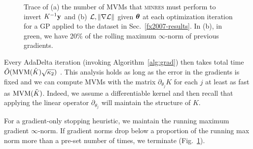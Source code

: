 \documentclass{article}
\begin{document}
\begin{figure}[!h]
\begin{center}
\end{center}
\caption{Trace of (a) the number of MVMs that \textsc{minres} must perform to invert $K^{-1}\textbf{y}$ and (b) $\mathcal{L}, \left\| \nabla\mathcal{L} \right\|$ given ${\boldsymbol\theta}$ at each optimization iteration for a GP applied to the dataset in Sec.~\ref{fx2007-results}. In (b), in green, we have 20\% of the rolling maximum $\infty$-norm of previous gradients.
}
\label{fx2007-iterations}
\end{figure}

Every AdaDelta iteration (invoking Algorithm~\ref{alg:grad}) then takes total time $\tilde{O}(\operatorname{MVM}(\tilde{K})\sqrt{\kappa_2})$ \cite{raykar2007fast}. This analysis holds as long as the error in the gradients is fixed and we can compute MVMs with the matrix $\partial_{\theta_j}K$ for each $j$ at least as fast as $\operatorname{MVM}({\tilde{K}})$. Indeed, we assume a differentiable kernel and then recall that applying the linear operator $\partial_{\theta_j}$ will maintain the structure of $K$.

For a gradient-only stopping heuristic, we maintain the running maximum gradient $\infty$-norm. If gradient norms drop below a proportion of the running max norm more than a pre-set number of times, we terminate (Fig.~\ref{fx2007-iterations}).
\end{document}
